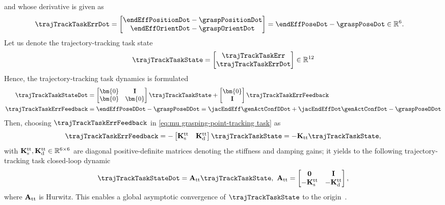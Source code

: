 	and whose derivative is given as 
	\begin{align}\label{eq:grajectory tracking errorDot}
		\trajTrackTaskErrDot &= 
		\begin{bmatrix}
			\endEffPositionDot -\graspPositionDot \\ \endEffOrientDot - \graspOrientDot
		\end{bmatrix}= \endEffPoseDot-\graspPoseDot\in \mathbb{R}^{6}.
	\end{align}
	Let us denote the trajectory-tracking task state 
	\begin{align}\label{eq:grasping-point-tracking task state}
		\trajTrackTaskState = 
		\begin{bmatrix}
			\trajTrackTaskErr \\ 	\trajTrackTaskErrDot
		\end{bmatrix}\in\mathbb{R}^{12} 
	\end{align}
	Hence, the trajectory-tracking task dynamics is formulated 
	\begin{align}
		\trajTrackTaskStateDot &= 
		\begin{bmatrix}
			\bm{0} & \mathbf{I} \\ \bm{0} &\bm{0} 
		\end{bmatrix}\trajTrackTaskState+ 
		\begin{bmatrix}
			\bm{0} \\  \mathbf{I}
		\end{bmatrix} \trajTrackTaskErrFeedback \\
		\label{eq:mu grasping-point-tracking task}\trajTrackTaskErrFeedback  &=\endEffPoseDDot-\graspPoseDDot = \jacEndEff\genActConfDDot + \jacEndEffDot\genActConfDot - \graspPoseDDot
	\end{align}
	Then, choosing $\trajTrackTaskErrFeedback$ in \cref{eq:mu grasping-point-tracking task} as 
	\begin{equation}\label{eq:grasping-point-tracking task feedback law}
		\trajTrackTaskErrFeedback = - \begin{bmatrix}
			\mathbf{K}_{\rm s}^{\rm tt} & \mathbf{K}_{\rm d}^{\rm tt} 
		\end{bmatrix} \trajTrackTaskState = -\mathbf{K}_{\rm tt}\trajTrackTaskState,
	\end{equation}
	with $\mathbf{K}_{\rm s}^{\rm tt} , \mathbf{K}_{\rm d}^{\rm tt} \in\mathbb{R}^{6\times6}$ are diagonal positive-definite matrices denoting the stiffness and damping gains; it yields to the following trajectory-tracking task closed-loop dynamic
	\begin{equation}
		\label{eq:grasping-point-tracking-task closed-loop}\trajTrackTaskStateDot
		= \mathbf{A}_{\rm tt}\trajTrackTaskState, \ \mathbf{A}_{\rm tt} = 
		\begin{bmatrix}
			\mathbf{0} & \mathbf{I} \\ -\mathbf{K}_{\rm s}^{\rm tt} & -\mathbf{K}_{\rm d}^{\rm tt}
		\end{bmatrix},
	\end{equation}
	where $\mathbf{A}_{\rm tt}$ is Hurwitz. This enables a global asymptotic convergence of  $\trajTrackTaskState$ to the origin~\cite{khalil2002NonLinearSystems}. 
	
